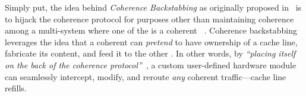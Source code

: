         Simply put, the idea behind \emph{Coherence Backstabbing} as originally proposed in~\cite{CAESAR} is to hijack the coherence protocol for purposes other than maintaining coherence among a multi-\pe system where one of the  is a coherent \fpga~\cite{enzian2020cidr}.
        Coherence backstabbing leverages the idea that a coherent \pe can \emph{pretend} to have ownership of a cache line, fabricate its content, and feed it to the other \pe.
        In other words, by \emph{``placing itself on the back of the coherence protocol''}~\cite{CAESAR}, a custom user-defined hardware module can seamlessly intercept, modify, and reroute \emph{any} coherent traffic---\eg cache line refills.
